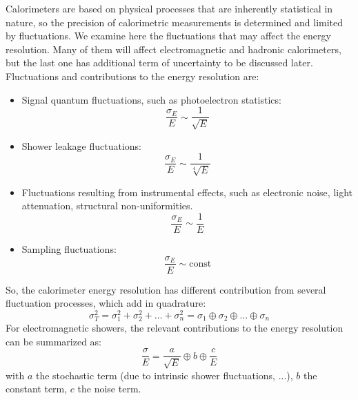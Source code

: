 \documentclass[../../main/main.tex]{subfiles}
\begin{document}
Calorimeters are based on physical processes that are inherently statistical in nature, so the precision of calorimetric measurements is determined and limited by fluctuations. We examine here the fluctuations that may affect the energy resolution. Many of them will affect electromagnetic and hadronic calorimeters, but the last one has additional term of uncertainty to be discussed later. Fluctuations and contributions to the energy resolution are:
\begin{itemize}
	\item Signal quantum fluctuations, such as photoelectron statistics:
		\begin{equation}
			\frac{\sigma_E}{E}
			\sim
			\frac{1}{\sqrt{E}}
			\label{eq:L05_CSQF}
		\end{equation}

	\item Shower leakage fluctuations:
		\begin{equation}
			\frac{\sigma_E}{E}
			\sim
			\frac{1}{\sqrt[4]{E}}
			\label{eq:L05_CSLF}
		\end{equation}

	\item Fluctuations resulting from instrumental effects, such as electronic noise, light attenuation, structural non-uniformities.
		\begin{equation}
			\frac{\sigma_E}{E}
			\sim
			\frac{1}{E}
			\label{eq:L05_CIEF}
		\end{equation}

	\item Sampling fluctuations:
		\begin{equation}
			\frac{\sigma_E}{E}
			\sim
			\text{const}
			\label{eq:L05_CSF}
		\end{equation}
\end{itemize}

So, the calorimeter energy resolution has different contribution from several fluctuation processes, which add in quadrature:
\begin{equation}
	\sigma_T^2
	=
	\sigma_1^2 + \sigma_2^2 + \dots + \sigma_n^2
	=
	\sigma_1 \oplus \sigma_2 \oplus \dots \oplus \sigma_n
	\label{eq:L05_CFQS}
\end{equation}
For electromagnetic showers, the relevant contributions to the energy resolution can be summarized as:
\begin{equation}
	\frac{\sigma}{E}
	=
	\frac{a}{\sqrt{E}} \oplus b \oplus \frac{c}{E}
	\label{eq:L05_CFRC}
\end{equation}
with \( a \) the stochastic term (due to intrinsic shower fluctuations, ...), \( b \) the constant term, \( c \) the noise term.
\end{document}
